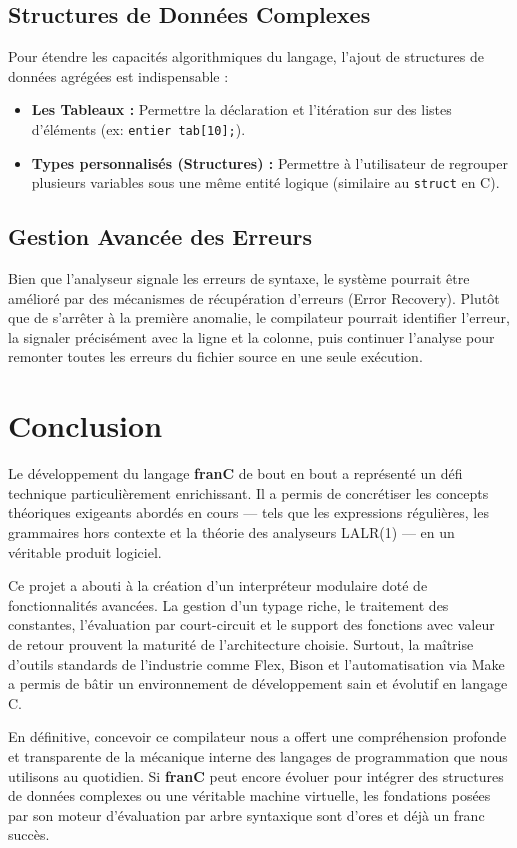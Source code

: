 \documentclass[pfe ,titlesmallcaps]{isi_report}
\begin{document}
\section{Structures de Données Complexes}
Pour étendre les capacités algorithmiques du langage, l'ajout de structures de données agrégées est indispensable :
\begin{itemize}
	\item \textbf{Les Tableaux :} Permettre la déclaration et l'itération sur des listes d'éléments (ex: \texttt{entier tab[10];}).
	\item \textbf{Types personnalisés (Structures) :} Permettre à l'utilisateur de regrouper plusieurs variables sous une même entité logique (similaire au \texttt{struct} en C).
\end{itemize}

\section{Gestion Avancée des Erreurs}
Bien que l'analyseur signale les erreurs de syntaxe, le système pourrait être amélioré par des mécanismes de récupération d'erreurs (Error Recovery). Plutôt que de s'arrêter à la première anomalie, le compilateur pourrait identifier l'erreur, la signaler précisément avec la ligne et la colonne, puis continuer l'analyse pour remonter toutes les erreurs du fichier source en une seule exécution.

\chapter{Conclusion}
Le développement du langage \textbf{franC} de bout en bout a représenté un défi technique particulièrement enrichissant. Il a permis de concrétiser les concepts théoriques exigeants abordés en cours — tels que les expressions régulières, les grammaires hors contexte et la théorie des analyseurs LALR(1) — en un véritable produit logiciel.

Ce projet a abouti à la création d'un interpréteur modulaire doté de fonctionnalités avancées. La gestion d'un typage riche, le traitement des constantes, l'évaluation par court-circuit et le support des fonctions avec valeur de retour prouvent la maturité de l'architecture choisie. Surtout, la maîtrise d'outils standards de l'industrie comme Flex, Bison et l'automatisation via Make a permis de bâtir un environnement de développement sain et évolutif en langage C.

En définitive, concevoir ce compilateur nous a offert une compréhension profonde et transparente de la mécanique interne des langages de programmation que nous utilisons au quotidien. Si \textbf{franC} peut encore évoluer pour intégrer des structures de données complexes ou une véritable machine virtuelle, les fondations posées par son moteur d'évaluation par arbre syntaxique sont d'ores et déjà un franc succès.
\end{document}
